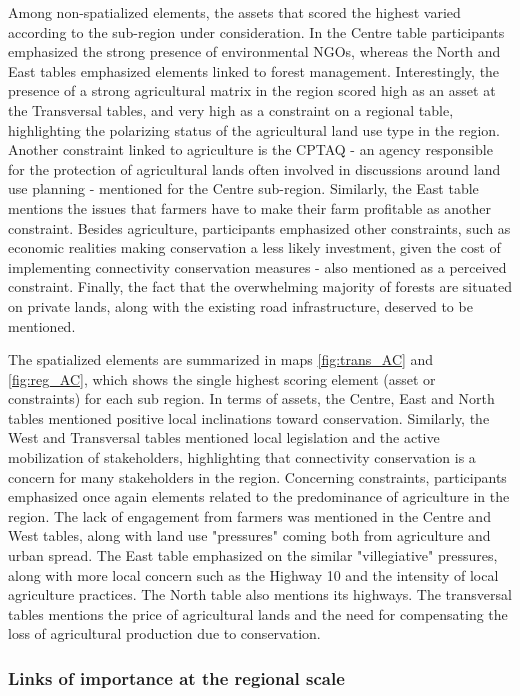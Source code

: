 Among non-spatialized elements, the assets that scored the highest varied according to the sub-region under consideration. In the Centre table participants emphasized the strong presence of environmental NGOs, whereas the North and East tables emphasized elements linked to forest management. Interestingly, the presence of a strong agricultural matrix in the region scored high as an asset at the Transversal tables, and very high as a constraint on a regional table, highlighting the polarizing status of the agricultural land use type in the region. Another constraint linked to agriculture is the CPTAQ - an agency responsible for the protection of agricultural lands often involved in discussions around land use planning - mentioned for the Centre sub-region. Similarly, the East table mentions the issues that farmers have to make their farm profitable as another constraint. Besides agriculture, participants emphasized other constraints, such as economic realities making conservation a less likely investment, given the cost of implementing connectivity conservation measures - also mentioned as a perceived constraint. Finally, the fact that the overwhelming majority of forests are situated on private lands, along with the existing road infrastructure, deserved to be mentioned.

The spatialized elements are summarized in maps \ref{fig:trans_AC} and \ref{fig:reg_AC}, which shows the single highest scoring element (asset or constraints) for each sub region. In terms of assets, the Centre, East and North tables mentioned positive local inclinations toward conservation. Similarly, the West and Transversal tables mentioned local legislation and the active mobilization of stakeholders, highlighting that connectivity conservation is a concern for many stakeholders in the region. Concerning constraints, participants emphasized once again elements related to the predominance of agriculture in the region. The lack of engagement from farmers was mentioned in the Centre and West tables, along with land use "pressures" coming both from agriculture and urban spread. The East table emphasized on the similar "villegiative" pressures, along with more local concern such as the Highway 10 and the intensity of local agriculture practices. The North table also mentions its highways. The transversal tables mentions the price of agricultural lands and the need for compensating the loss of agricultural production due to conservation. \\

\subsubsection{Links of importance at the regional scale}

